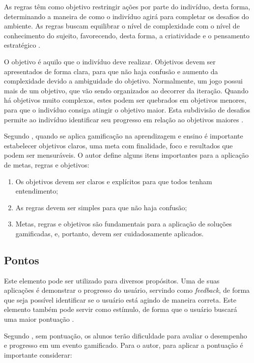 \documentclass[
	12pt,				%
	oneside,			%
	a4paper,			%
	english,			%
	french,				%
	spanish,			%
	brazil,				%
	]{abntex2}
\begin{document}
As regras têm como objetivo restringir ações por parte do indivíduo, desta forma, determinando a maneira de como o indivíduo agirá para completar os desafios do ambiente. As regras buscam equilibrar o nível de complexidade com o nível de conhecimento do sujeito, favorecendo, desta forma, a criatividade e o pensamento estratégico \cite{bunchball2016gamification}.

O objetivo é aquilo que o indivíduo deve realizar. Objetivos devem ser apresentados de forma clara, para que não haja confusão e aumento da complexidade devido a ambiguidade do objetivo. Normalmente, um jogo possui mais de um objetivo, que vão sendo organizados ao decorrer da iteração. Quando há objetivos muito complexos, estes podem ser quebrados em objetivos menores, para que o indivíduo consiga atingir o objetivo maior. Esta subdivisão de desafios permite ao indivíduo identificar seu progresso em relação ao objetivos maiores \cite{fardo2013gamificaccao}.

Segundo \citet{andre2018}, quando se aplica gamificação na aprendizagem e ensino é importante estabelecer objetivos claros, uma meta com finalidade, foco e resultados que podem ser mensuráveis. O autor define alguns itens importantes para a aplicação de metas, regras e objetivos:

\begin{enumerate}
\item Os objetivos devem ser claros e explícitos para que todos tenham entendimento;
\item As regras devem ser simples para que não haja confusão;
\item Metas, regras e objetivos são fundamentais para a aplicação de soluções gamificadas, e, portanto, devem ser cuidadosamente aplicados.
\end{enumerate}

\subsection{Pontos}

Este elemento pode ser utilizado para diversos propósitos. Uma de suas aplicações é demonstrar o progresso do usuário, servindo como \textit{feedback}, de forma que seja possível identificar se o usuário está agindo de maneira correta. Este elemento também pode servir como estímulo, de forma que o usuário buscará uma maior pontuação \cite{kaap:2014}.

Segundo \citet{andre2018}, sem pontuação, os alunos terão dificuldade para avaliar o desempenho e progresso em um evento gamificado. Para o autor, para aplicar a pontuação é importante considerar:
\end{document}

